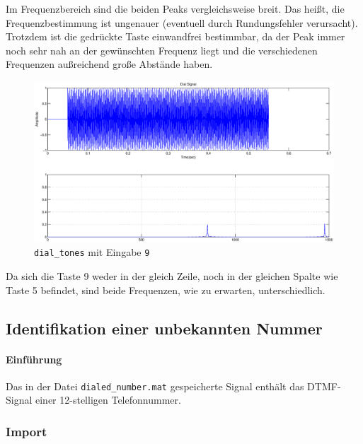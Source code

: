 \documentclass[10pt]{scrreprt}
\begin{document}
        Im Frequenzbereich sind die beiden Peaks vergleichsweise breit. Das heißt, die
        Frequenzbestimmung ist ungenauer (eventuell durch Rundungsfehler verursacht).
        Trotzdem ist die gedrückte Taste einwandfrei bestimmbar, da der Peak immer noch
        sehr nah an der gewünschten Frequenz liegt und die verschiedenen Frequenzen
        außreichend große Abstände haben.

        \vspace{2cm}

        \begin{center}
            \begin{figure}[H]
                \includegraphics[width=\textwidth]{img43422}
                \caption{\texttt{dial\_tones} mit Eingabe \texttt{9}}
            \end{figure}
        \end{center}

        Da sich die Taste 9 weder in der gleich Zeile, noch in der gleichen Spalte wie
        Taste 5 befindet, sind beide Frequenzen, wie zu erwarten, unterschiedlich.

        \subsection{Identifikation einer unbekannten Nummer}
        \paragraph{Einführung}
        Das in der Datei \texttt{dialed\_number.mat} gespeicherte Signal enthält das DTMF-Signal einer
        12-stelligen Telefonnummer.


        \subsubsection{Import}
\end{document}
